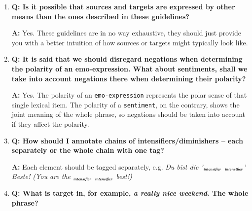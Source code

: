 \documentclass[11pt,a4paper]{article}
\theoremstyle{mytheoremstyle}
\newtheorem{exmp}{Example}[section]
\newcommand{\mtag}[2]{{\upshape[\emph{#2}\upshape]$_{\textrm{\bfseries\emph{\tiny
        #1}}}$}}
\newcommand{\sentiment}[2][]{\mtag{sen\-ti\-ment\ifstrempty{#1}{}{:#1}}{#2}}
\newcommand{\target}[2][]{\mtag{tar\-get\ifstrempty{#1}{}{:#1}}{#2}}
\newcommand{\emoexpression}[2][]{\mtag{emo-\-ex\-pression\ifstrempty{#1}{}{:#1}}{#2}}
\newcommand{\intensifier}[2][]{\mtag{in\-ten\-si\-fier\ifstrempty{#1}{}{:#1}}{#2}}
\begin{document}
\begin{enumerate}
  \textbf{A:} Usually, yes.  If someone expresses a wish to get or to
  do something, then this person typically also has a positive
  attitude to the desired object or activity (cf. Example \ref{exmp:desire}).

  \begin{exmp}
    \sentiment[polarity=positive]{Habe \intensifier{sooooo}
      \emoexpression[polarity=positive]{Lust} auf \target{einen Dattel
        / Bananen Milchshake}
      .. \emoexpression[polarity=positive]{:-)}
      \emoexpression[polarity=positive]{*\_{}*}}

    (
    \sentiment[polarity=positive]{\emoexpression[polarity=positive]{Am}
      \intensifier{sooooo} \emoexpression[polarity=positive]{up for}
      \target{a date / banana milk shake}
      .. \emoexpression[polarity=positive]{:-)}
      \emoexpression[polarity=positive]{*\_{}*}} )\label{exmp:desire}
  \end{exmp}

\item\textbf{Q: Is it possible that sources and targets are expressed
  by other means than the ones described in these guidelines?}

  \textbf{A:} Yes. These guidelines are in no way exhaustive, they
  should just provide you with a better intuition of how sources or
  targets might typically look like.

\item\textbf{Q: It is said that we should disregard negations when
  determining the polarity of an emo-expression.  What about
  sentiments, shall we take into account negations there when
  determining their polarity?}

  \textbf{A:} Yes.  The polarity of an \texttt{emo-expression}
  represents the polar sense of that single lexical item.  The
  polarity of a \texttt{sentiment}, on the contrary, shows the joint
  meaning of the whole phrase, so negations should be taken into
  account if they affect the polarity.

\item\textbf{Q: How should I annotate chains of
  intensifiers/diminishers -- each separately or the whole chain with
  one tag?}

  \textbf{A:} Each element should be tagged separately,
  e.g. \textit{Du bist die '\intensifier{aller} \intensifier{aller}'
    Beste! (You are the \intensifier{very} \intensifier{very} best!)}

\item\textbf{Q: What is target in, for example, \textit{a really nice
    weekend}.  The whole phrase?}


\end{enumerate}
\end{document}
